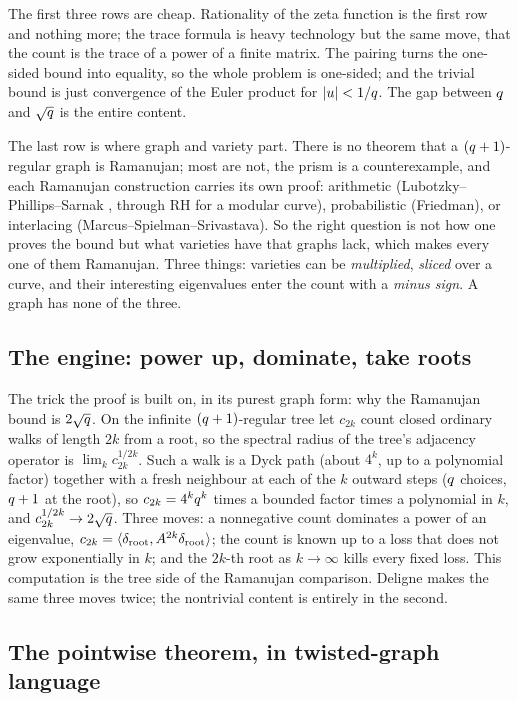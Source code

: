 The first three rows are cheap. Rationality of the zeta function is the first row and nothing more; the
trace formula is heavy technology but the same move, that the count is the trace of a power of a finite
matrix. The pairing turns the one-sided bound into equality, so the whole problem is one-sided; and the
trivial bound is just convergence of the Euler product for $|u| < 1/q$. The gap between $q$ and
$\sqrt{q}$ is the entire content.

The last row is where graph and variety part. There is no theorem that a $(q+1)$-regular graph is
Ramanujan; most are not, the prism is a counterexample, and each Ramanujan construction carries its own
proof: arithmetic (Lubotzky--Phillips--Sarnak \cite{lubotzky1988ramanujan}, through RH for a modular
curve), probabilistic (Friedman), or interlacing (Marcus--Spielman--Srivastava). So the right question is
not how one proves the bound but
what varieties have that graphs lack, which makes every one of them Ramanujan. Three things: varieties can
be \emph{multiplied}, \emph{sliced} over a curve, and their interesting eigenvalues enter the count with a
\emph{minus sign}. A graph has none of the three.

\subsection{The engine: power up, dominate, take roots}

The trick the proof is built on, in its purest graph form: why the Ramanujan bound is $2\sqrt{q}$. On the
infinite $(q+1)$-regular tree let $c_{2k}$ count closed ordinary walks of length $2k$ from a root, so the
spectral radius of the tree's adjacency operator is $\lim_k c_{2k}^{1/2k}$. Such a walk is a Dyck path
(about $4^k$, up to a polynomial factor) together with a fresh neighbour at each of the $k$ outward steps
($q$ choices, $q+1$ at the root), so $c_{2k} = 4^kq^k$ times a bounded factor times a polynomial in
$k$, and $c_{2k}^{1/2k}\to2\sqrt{q}$. Three moves: a nonnegative count dominates a power of an eigenvalue,
$c_{2k} = \langle\delta_{\mathrm{root}},A^{2k}\delta_{\mathrm{root}}\rangle$; the count is known up to a
loss that does not grow exponentially in $k$; and the $2k$-th root as $k\to\infty$ kills every fixed loss.
This computation is the tree side of the Ramanujan comparison. Deligne makes the same three moves twice; the
nontrivial content is entirely in the second.

\subsection{The pointwise theorem, in twisted-graph language}

